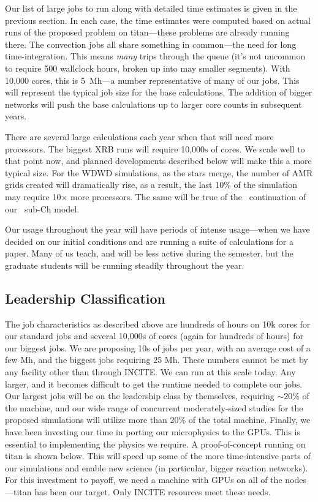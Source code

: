 Our list of large jobs to run along with detailed time estimates is
given in the previous section.  In each case, the time estimates were
computed based on actual runs of the proposed problem on titan---these
problems are already running there.  The convection jobs all share
something in common---the need for long time-integration.  This means
{\em many} trips through the queue (it's not uncommon to require 500
wallclock hours, broken up into may smaller segments).  With 10,000
cores, this is 5~Mh---a number representative of many of our jobs.
This will represent the typical job size for the base calculations.
The addition of bigger networks will push the base calculations up to
larger core counts in subsequent years.

There are several large calculations each year when that will need more
processors.  The biggest XRB runs will require 10,000s of cores.  We
scale well to that point now, and planned developments described
below will make this a more typical size.  For the WDWD simulations,
as the stars merge, the number of AMR grids created will dramatically
rise, as a result, the last 10\% of the simulation may require
10$\times$ more processors.  The same will be true of the
\castro\ continuation of our \maestro\ sub-Ch model.

Our usage throughout the year will have periods of intense
usage---when we have decided on our initial conditions and are running
a suite of calculations for a paper.  Many of us teach, and will be
less active during the semester, but the graduate students will be running
steadily throughout the year.


\subsection{Leadership Classification}

The job characteristics as described above are hundreds of hours on
10k cores for our standard jobs and several 10,000s of cores (again
for hundreds of hours) for our biggest jobs.  We are proposing 10s of
jobs per year, with an average cost of a few Mh, and the biggest jobs
requiring 25 Mh.  These numbers cannot be met by any facility other
than through INCITE.  We can run at this scale today.  Any larger, and
it becomes difficult to get the runtime needed to complete our jobs.
Our largest jobs will be on the leadership class by themselves,
requiring $\sim 20$\% of the machine, and our wide range of concurrent
moderately-sized studies for the proposed simulations will utilize
more than 20\% of the total machine.  Finally, we have been investing
our time in porting our microphysics to the GPUs.  This is essential
to implementing the physics we require.  A proof-of-concept
running on titan is shown below.  This will speed up some of the more
time-intensive parts of our simulations and enable new science (in
particular, bigger reaction networks).  For this investment to payoff,
we need a machine with GPUs on all of the nodes---titan has been our
target.  Only INCITE resources meet these needs.

